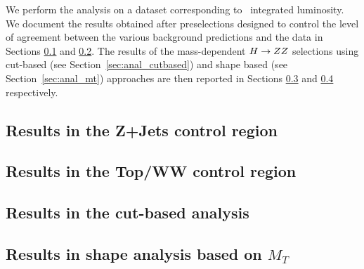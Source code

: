 We perform the analysis on a dataset corresponding to \intlumi\ integrated luminosity. 
We document the results obtained after preselections
designed to control the level of agreement between the various background predictions
and the data in Sections \ref{sec:results_zzpresel} and \ref{sec:results_topww}.
The results of the mass-dependent $H\to ZZ$ selections using cut-based 
(see Section~\ref{sec:anal_cutbased}) and shape based (see Section~\ref{sec:anal_mt}) approaches
are then reported in Sections \ref{sec:results_cut} and \ref{sec:results_mtshape} respectively.

\subsection{Results in the Z+Jets control region}
\label{sec:results_zzpresel}

\clearpage

\subsection{Results in the Top/WW control region}
\label{sec:results_topww}

\clearpage

\subsection{Results in the cut-based analysis}
\label{sec:results_cut}

\clearpage

\subsection{Results in shape analysis based on $M_T$}
\label{sec:results_mtshape}

\clearpage
 
